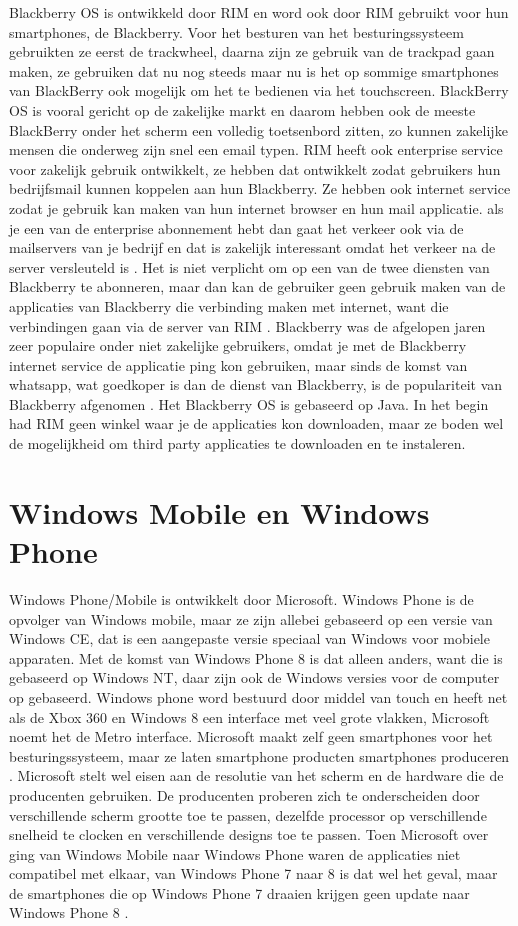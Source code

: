Blackberry OS is ontwikkeld door RIM en word ook door RIM gebruikt voor hun smartphones, de Blackberry. Voor het besturen van het besturingssysteem gebruikten ze eerst de trackwheel, daarna zijn ze gebruik van de trackpad gaan maken, ze gebruiken dat nu nog steeds maar nu is het op sommige smartphones van BlackBerry ook mogelijk om het te bedienen via het touchscreen. BlackBerry OS is vooral gericht op de zakelijke markt en daarom hebben ook de meeste BlackBerry onder het scherm een volledig toetsenbord zitten, zo kunnen zakelijke mensen die onderweg zijn snel een email typen. RIM heeft ook enterprise service voor zakelijk gebruik ontwikkelt, ze hebben dat ontwikkelt zodat gebruikers hun bedrijfsmail kunnen koppelen aan hun Blackberry. Ze hebben ook internet service zodat je gebruik kan maken van hun internet browser en hun mail applicatie.  als je een van de enterprise abonnement hebt dan gaat het verkeer ook via de mailservers van je bedrijf en dat is zakelijk interessant omdat het verkeer na de server versleuteld is \citep{webwereld}. Het is niet verplicht om op een van de twee diensten van Blackberry te abonneren, maar dan kan de gebruiker geen gebruik maken van de applicaties van Blackberry die verbinding maken met internet, want die verbindingen gaan via de server van RIM \citep{wikipedia}. Blackberry was de afgelopen jaren zeer populaire onder niet zakelijke gebruikers, omdat je met de Blackberry internet service de applicatie ping kon gebruiken, maar sinds de komst van whatsapp, wat goedkoper is dan de dienst van Blackberry, is de populariteit van Blackberry afgenomen \citep{consumentenbond}. Het Blackberry OS is gebaseerd op Java. In het begin had RIM geen winkel waar je de applicaties kon downloaden, maar ze boden wel de mogelijkheid om third party applicaties te downloaden en te instaleren.

\section{Windows Mobile en Windows Phone}

Windows Phone/Mobile is ontwikkelt door Microsoft. Windows Phone is de opvolger van Windows mobile, maar ze zijn allebei gebaseerd op een versie van Windows CE, dat is een aangepaste versie speciaal van Windows voor mobiele apparaten. Met de komst van Windows Phone 8 is dat alleen anders, want die is gebaseerd op Windows NT, daar zijn ook de Windows versies voor de computer op gebaseerd. Windows phone word bestuurd door middel van touch en heeft net als de Xbox 360 en Windows 8 een interface met veel grote vlakken, Microsoft noemt het de Metro interface. Microsoft maakt zelf geen smartphones voor het besturingssysteem, maar ze laten smartphone producten smartphones produceren \citep{nrc}. Microsoft stelt wel eisen aan de resolutie van het scherm en de hardware die de producenten gebruiken. De producenten proberen zich te onderscheiden door verschillende scherm grootte toe te passen, dezelfde processor op verschillende snelheid te clocken en verschillende designs toe te passen. Toen Microsoft over ging van Windows Mobile naar Windows Phone waren de applicaties niet compatibel met elkaar, van Windows Phone 7 naar 8 is dat wel het geval, maar de smartphones die op Windows Phone 7 draaien krijgen geen update naar Windows Phone 8 \citep{tweakers}.
 
 
